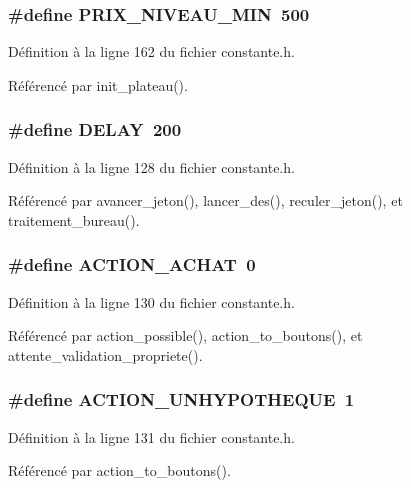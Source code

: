 \subsubsection{\setlength{\rightskip}{0pt plus 5cm}\#define PRIX\_\-NIVEAU\_\-MIN~500}\label{constante_8h_551aa387cb0ed6375a86b626c1c400c6}




D\'{e}finition \`{a} la ligne 162 du fichier constante.h.

R\'{e}f\'{e}renc\'{e} par init\_\-plateau().
\subsubsection{\setlength{\rightskip}{0pt plus 5cm}\#define DELAY~200}\label{constante_8h_62249e384b997229a3e2ae74ade334e2}




D\'{e}finition \`{a} la ligne 128 du fichier constante.h.

R\'{e}f\'{e}renc\'{e} par avancer\_\-jeton(), lancer\_\-des(), reculer\_\-jeton(), et traitement\_\-bureau().
\subsubsection{\setlength{\rightskip}{0pt plus 5cm}\#define ACTION\_\-ACHAT~0}\label{constante_8h_89f8379249353c504598f1d150cffb33}




D\'{e}finition \`{a} la ligne 130 du fichier constante.h.

R\'{e}f\'{e}renc\'{e} par action\_\-possible(), action\_\-to\_\-boutons(), et attente\_\-validation\_\-propriete().
\subsubsection{\setlength{\rightskip}{0pt plus 5cm}\#define ACTION\_\-UNHYPOTHEQUE~1}\label{constante_8h_c850e214252fdab051443549ebecc375}




D\'{e}finition \`{a} la ligne 131 du fichier constante.h.

R\'{e}f\'{e}renc\'{e} par action\_\-to\_\-boutons().
